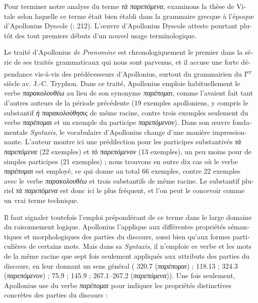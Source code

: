 \documentclass[output=paper]{langsci/langscibook}
\begin{document}
\begin{otherlanguage}{french}
Pour terminer notre analyse du terme \textit{τὰ παρεπόμενα}, examinons la thèse de Vitale selon laquelle ce terme était bien établi dans la grammaire grecque à l’époque d’Apollonius Dyscole (\citealt{vitale_per_1982}: 212). L’œuvre d’Apollonius Dyscole atteste pourtant plutôt des tout premiers débuts d’un nouvel usage terminologique. 

Le traité d’Apollonius \textit{de Pronomine} est chronologiquement le premier dans la série de ses traités grammaticaux qui nous sont parvenus, et il accuse une forte dépendance vis-à-vis des prédécesseurs d’Apollonius, surtout du grammairien du I\textsuperscript{er} siècle av. J.-C. Tryphon. Dans ce traité, Apollonius emploie habituellement le verbe \textit{παρακολουθέω} au lieu de son synonyme \textit{παρέπομαι}, comme l’avaient fait tant d’autres auteurs de la période précédente (19 exemples apolloniens, y compris le substantif \textit{ἡ παρακολούθησις} de même racine, contre trois exemples seulement du verbe \textit{παρέπομαι} et un exemple du participe \textit{παρεπόμενον}). Dans son œuvre fondamentale \textit{Syntaxis}, le vocabulaire d’Apollonius change d’une manière impressionnante. L’auteur montre ici une prédilection pour les participes substantivés \textit{τὰ παρεπόμενα} (22 exemples) et \textit{τὸ παρεπόμενον} (13 exemples), un peu moins pour de simples participes (21 exemples) ; nous trouvons en outre dix cas où le verbe \textit{παρέπομαι} est employé, ce qui donne au total 66 exemples, contre 22 exemples avec le verbe \textit{παρακολουθέω} et trois substantifs de même racine. Le substantif pluriel \textit{τὰ παρεπόμενα} est donc ici le plus fréquent, et l’on peut le concevoir comme un vrai terme technique. 

Il faut signaler toutefois l’emploi prépondérant de ce terme dans le large domaine du raisonnement logique. Apollonius l’applique aux différentes propriétés sémantiques et morphologiques des parties du discours, aussi bien qu’aux formes particulières de certains mots. Mais dans sa \textit{Syntaxis}, il n’emploie ce verbe et les mots de la même racine que sept fois seulement appliqués aux attributs des parties du discours, en leur donnant un sens général ( 320.7 (\textit{παρέπομαι}) ; 118.13 ; 324.3 (\textit{παρεπόμενον}) ; 75.9 ; 145.9 ; 267.1--267.2 (\textit{παρεπόμενα})). Une fois seulement, Apollonius use du verbe \textit{παρέπομαι} pour indiquer les propriétés distinctives concrètes des parties du discours :


\end{otherlanguage}
\end{document}
